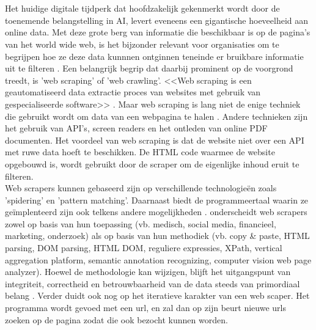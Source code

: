 \chapter{}%
\label{ch:stand-van-zaken}


Het huidige digitale tijdperk dat hoofdzakelijk gekenmerkt wordt door de toenemende belangstelling in AI, levert eveneens een gigantische hoeveelheid aan online data. Met deze grote berg van informatie die beschikbaar is op de pagina's van het world wide web, is het bijzonder relevant voor organisaties om te begrijpen hoe ze deze data kunnnen ontginnen teneinde er bruikbare informatie uit te filteren \autocite{Lotfi2021}. Een belangrijk begrip dat daarbij prominent op de voorgrond treedt, is 'web scraping' of 'web crawling'. <<Web scraping is een geautomatiseerd data extractie proces van websites met gebruik van gespecialiseerde software>> \autocite{Bhatt2023}. Maar web scraping is lang niet de enige techniek die gebruikt wordt om data van een webpagina te halen \autocite{Gray2012}. Andere technieken zijn het gebruik van API's, screen readers en het ontleden van online PDF documenten. Het voordeel van web scraping is dat de website niet over een API met ruwe data hoeft te beschikken. De HTML code waarmee de website opgebouwd is, wordt gebruikt door de scraper om de eigenlijke inhoud eruit te filteren.\\
Web scrapers kunnen gebaseerd zijn op verschillende technologieën zoals 'spidering' en 'pattern matching'. Daarnaast biedt de programmeertaal waarin ze geïmplenteerd zijn ook telkens andere mogelijkheden \autocite{Bhatt2023}.
\textcite{Lotfi2021} onderscheidt web scrapers zowel op basis van hun toepassing (vb. medisch, social media, financieel, marketing, onderzoek) als op basis van hun  methodiek (vb. copy \& paste, HTML parsing, DOM parsing, HTML DOM, reguliere expressies, XPath, vertical aggregation platform, semantic annotation recognizing, computer vision web page analyzer). Hoewel de methodologie kan wijzigen, blijft het uitgangspunt van integriteit, correctheid en betrouwbaarheid van de data steeds van primordiaal belang \autocite{Lotfi2021}.
Verder duidt \textcite{Lotfi2021} ook nog op het iteratieve karakter van een web scaper. Het programma wordt gevoed met een url, en zal dan op zijn beurt nieuwe urls zoeken op de pagina zodat die ook bezocht kunnen worden.\\
